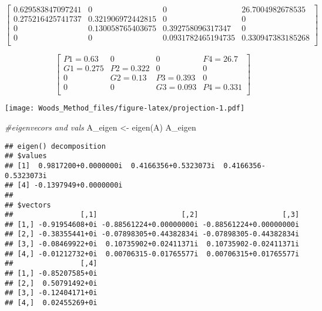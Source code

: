 \documentclass[
]{article}
\newenvironment{Shaded}{\begin{snugshade}}{\end{snugshade}}
\newcommand{\CommentTok}[1]{\textcolor[rgb]{0.56,0.35,0.01}{\textit{#1}}}
\newcommand{\DecValTok}[1]{\textcolor[rgb]{0.00,0.00,0.81}{#1}}
\newcommand{\FunctionTok}[1]{\textcolor[rgb]{0.00,0.00,0.00}{#1}}
\newcommand{\NormalTok}[1]{#1}
\newcommand{\OtherTok}[1]{\textcolor[rgb]{0.56,0.35,0.01}{#1}}
\newcommand{\SpecialCharTok}[1]{\textcolor[rgb]{0.00,0.00,0.00}{#1}}
\begin{document}
\[\begin{bmatrix}
0.629583847097241&0&0&26.7004982678535 \\
0.275216425741737&0.321906972442815&0&0 \\
0&0.130058765403675&0.392758096317347&0 \\
0&0&0.0931782465194735&0.330947383185268 \\
\end{bmatrix}\]

\[\begin{bmatrix}
P1 = 0.63&0&0&F4 = 26.7 \\
G1 = 0.275&P2 = 0.322&0&0 \\
0&G2 = 0.13&P3 = 0.393&0 \\
0&0&G3 = 0.093&P4 = 0.331 \\
\end{bmatrix}\]

\texttt{[image: Woods\_Method\_files/figure-latex/projection-1.pdf]}

\begin{Shaded}
\begin{Highlighting}[]
\CommentTok{\#eigenvecors and vals}
\NormalTok{A\_eigen }\OtherTok{\textless{}{-}} \FunctionTok{eigen}\NormalTok{(A)}
\NormalTok{A\_eigen}
\end{Highlighting}
\end{Shaded}

\begin{verbatim}
## eigen() decomposition
## $values
## [1]  0.9817200+0.0000000i  0.4166356+0.5323073i  0.4166356-0.5323073i
## [4] -0.1397949+0.0000000i
## 
## $vectors
##                [,1]                    [,2]                    [,3]
## [1,] -0.91954608+0i -0.88561224+0.00000000i -0.88561224+0.00000000i
## [2,] -0.38355441+0i -0.07898305+0.44382834i -0.07898305-0.44382834i
## [3,] -0.08469922+0i  0.10735902+0.02411371i  0.10735902-0.02411371i
## [4,] -0.01212732+0i  0.00706315-0.01765577i  0.00706315+0.01765577i
##                [,4]
## [1,] -0.85207585+0i
## [2,]  0.50791492+0i
## [3,] -0.12404171+0i
## [4,]  0.02455269+0i
\end{verbatim}

\begin{Shaded}
\end{Shaded}
\end{document}
